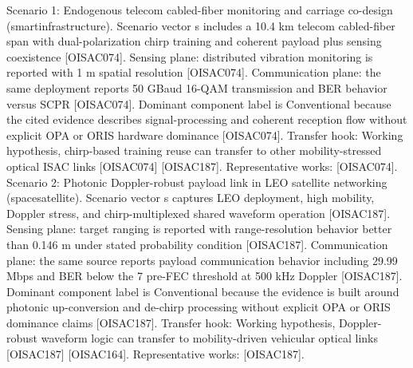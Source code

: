\markdownRendererInterblockSeparator
{}Scenario 1: Endogenous telecom cabled-fiber monitoring and carriage co-design (smart\markdownRendererUnderscore{}infrastructure).\markdownRendererHardLineBreak
{}Scenario vector s includes a 10.4 km telecom cabled-fiber span with dual-polarization chirp training and coherent payload plus sensing coexistence [O\markdownRendererUnderscore{}ISAC\markdownRendererUnderscore{}074]. Sensing plane: distributed vibration monitoring is reported with 1 m spatial resolution [O\markdownRendererUnderscore{}ISAC\markdownRendererUnderscore{}074]. Communication plane: the same deployment reports 50 GBaud 16-QAM transmission and BER behavior versus SCPR [O\markdownRendererUnderscore{}ISAC\markdownRendererUnderscore{}074]. Dominant component label is Conventional because the cited evidence describes signal-processing and coherent reception flow without explicit OPA or ORIS hardware dominance [O\markdownRendererUnderscore{}ISAC\markdownRendererUnderscore{}074]. Transfer hook: Working hypothesis, chirp-based training reuse can transfer to other mobility-stressed optical ISAC links [O\markdownRendererUnderscore{}ISAC\markdownRendererUnderscore{}074] [O\markdownRendererUnderscore{}ISAC\markdownRendererUnderscore{}187]. Representative works: [O\markdownRendererUnderscore{}ISAC\markdownRendererUnderscore{}074].\markdownRendererParagraphSeparator
{}Scenario 2: Photonic Doppler-robust payload link in LEO satellite networking (space\markdownRendererUnderscore{}satellite).\markdownRendererHardLineBreak
{}Scenario vector s captures LEO deployment, high mobility, Doppler stress, and chirp-multiplexed shared waveform operation [O\markdownRendererUnderscore{}ISAC\markdownRendererUnderscore{}187]. Sensing plane: target ranging is reported with range-resolution behavior better than 0.146 m under stated probability condition [O\markdownRendererUnderscore{}ISAC\markdownRendererUnderscore{}187]. Communication plane: the same source reports payload communication behavior including 29.99 Mbps and BER below the 7\markdownRendererPercentSign{} pre-FEC threshold at 500 kHz Doppler [O\markdownRendererUnderscore{}ISAC\markdownRendererUnderscore{}187]. Dominant component label is Conventional because the evidence is built around photonic up-conversion and de-chirp processing without explicit OPA or ORIS dominance claims [O\markdownRendererUnderscore{}ISAC\markdownRendererUnderscore{}187]. Transfer hook: Working hypothesis, Doppler-robust waveform logic can transfer to mobility-driven vehicular optical links [O\markdownRendererUnderscore{}ISAC\markdownRendererUnderscore{}187] [O\markdownRendererUnderscore{}ISAC\markdownRendererUnderscore{}164]. Representative works: [O\markdownRendererUnderscore{}ISAC\markdownRendererUnderscore{}187].\markdownRendererInterblockSeparator
